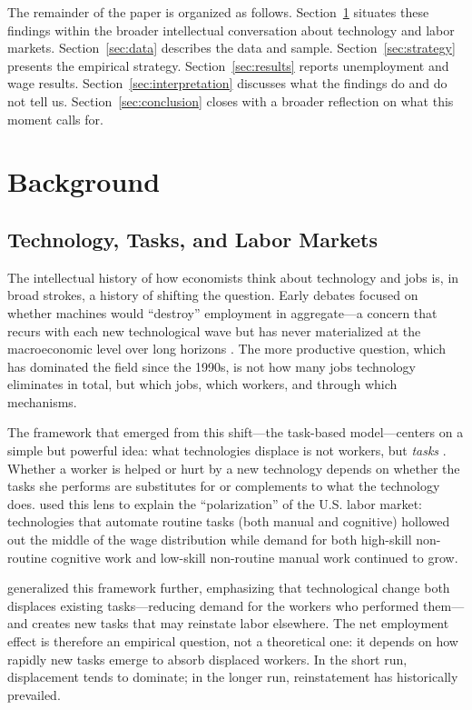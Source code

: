 \documentclass[11pt]{article}
\begin{document}
The remainder of the paper is organized as follows. Section~\ref{sec:background} situates these findings within the broader intellectual conversation about technology and labor markets. Section~\ref{sec:data} describes the data and sample. Section~\ref{sec:strategy} presents the empirical strategy. Section~\ref{sec:results} reports unemployment and wage results. Section~\ref{sec:interpretation} discusses what the findings do and do not tell us. Section~\ref{sec:conclusion} closes with a broader reflection on what this moment calls for.

\section{Background}
\label{sec:background}

\subsection{Technology, Tasks, and Labor Markets}

The intellectual history of how economists think about technology and jobs is, in broad strokes, a history of shifting the question. Early debates focused on whether machines would ``destroy'' employment in aggregate---a concern that recurs with each new technological wave but has never materialized at the macroeconomic level over long horizons \parencite{acemoglu2019automation}. The more productive question, which has dominated the field since the 1990s, is not how many jobs technology eliminates in total, but which jobs, which workers, and through which mechanisms.

The framework that emerged from this shift---the task-based model---centers on a simple but powerful idea: what technologies displace is not workers, but \emph{tasks} \parencite{autor2003skill,katz1992changes}. Whether a worker is helped or hurt by a new technology depends on whether the tasks she performs are substitutes for or complements to what the technology does. \textcite{autor2003skill} used this lens to explain the ``polarization'' of the U.S. labor market: technologies that automate routine tasks (both manual and cognitive) hollowed out the middle of the wage distribution while demand for both high-skill non-routine cognitive work and low-skill non-routine manual work continued to grow.

\textcite{acemoglu2019automation} generalized this framework further, emphasizing that technological change both displaces existing tasks---reducing demand for the workers who performed them---and creates new tasks that may reinstate labor elsewhere. The net employment effect is therefore an empirical question, not a theoretical one: it depends on how rapidly new tasks emerge to absorb displaced workers. In the short run, displacement tends to dominate; in the longer run, reinstatement has historically prevailed.
\end{document}
